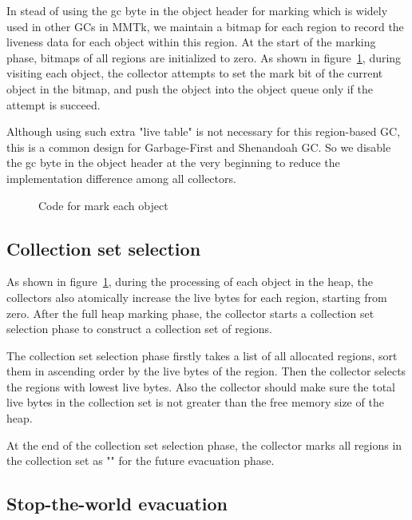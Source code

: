 In stead of using the gc byte in the object header for marking which is widely used in other GCs in MMTk,
we maintain a bitmap for each region to record the liveness data for each object within this region.
At the start of the marking phase, bitmaps of all regions are initialized to zero.
As shown in figure~\ref{fig:tracemarkobject}, during visiting each object, the collector attempts to set the mark bit
of the current object in the bitmap, and push the object into the object queue only if the attempt is succeed.

Although using such extra "live table" is not necessary for this region-based GC,
this is a common design for Garbage-First and Shenandoah GC.
So we disable the gc byte in the object header at the very beginning to reduce the implementation difference among all collectors.

\begin{figure}
  \centering
  
  \caption{Code for mark each object}
  \label{fig:tracemarkobject}
\end{figure}

\subsection{Collection set selection}

As shown in figure~\ref{fig:tracemarkobject}, during the processing of each object in the heap,
the collectors also atomically increase the live bytes for each region, starting from zero.
After the full heap marking phase, the collector starts a collection set selection phase to construct
a collection set of regions.

The collection set selection phase firstly takes a list of all allocated regions,
sort them in ascending order by the live bytes of the region.
Then the collector selects the regions with lowest live bytes.
Also the collector should make sure the total live bytes in the collection set is not
greater than the free memory size of the heap.

At the end of the collection set selection phase, the collector marks all regions
in the collection set as "" for the future evacuation phase.

\subsection{Stop-the-world evacuation}


